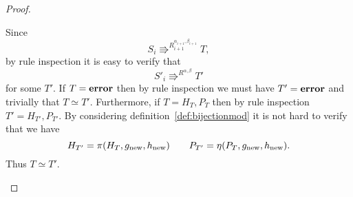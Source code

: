 \begin{proof}
\begin{description}
      Since
      \begin{equation}
        S_i \Rrightarrow^{R_{i+1}^{\alpha_{i+1}, \beta_{i+1}}} T,
      \end{equation}
      by rule inspection it is easy to verify that
      \begin{equation}
        S'_i \Rrightarrow^{R^{\alpha, \beta}} T'
      \end{equation}
      for some $T'$. If $T = \mbox{{\bf error}}$ then by rule inspection we must have $T' =
      \mbox{{\bf error}}$ and trivially that $T \simeq T'$. Furthermore, if $T = H_{T},
      P_{T}$ then by rule inspection $T' = H_{T'}, P_{T'}$. By considering
      definition~\ref{def:bijectionmod} it is not hard to verify that
      we have
      \begin{equation*}
        H_{T'} = \pi(H_T, g_{\text{new}}, h_{\text{new}}) \quad\quad P_{T'} =
        \eta(P_T, g_{\text{new}}, h_{\text{new}}).
      \end{equation*}
      Thus $T \simeq T'$.
  \end{description}
\end{proof}


